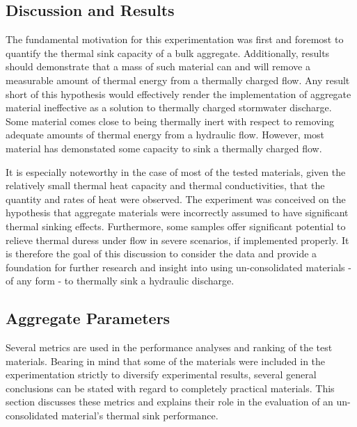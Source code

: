 

\begin{center}
\section{Discussion and Results}
\end{center}

The fundamental motivation for this experimentation was first and foremost to quantify the thermal sink capacity of a bulk aggregate. Additionally, results should demonstrate that a mass of such material can and will remove a measurable amount of thermal energy from a thermally charged flow. Any result short of this hypothesis would effectively render the implementation of aggregate material ineffective as a solution to thermally charged stormwater discharge. Some material comes close to being thermally inert with respect to removing adequate amounts of thermal energy from a hydraulic flow. However, most material has demonstated some capacity to sink a thermally charged flow.
 
It is especially noteworthy in the case of most of the tested materials, given the relatively small thermal heat capacity and thermal conductivities, that the quantity and rates of heat were observed. The experiment was conceived on the hypothesis that aggregate materials were incorrectly assumed to have significant thermal sinking effects. Furthermore, some samples offer significant potential to relieve thermal duress under flow in severe scenarios, if implemented properly. It is therefore the goal of this discussion to consider the data and provide a foundation for further research and insight into using un-consolidated materials - of any form - to thermally sink a hydraulic discharge.

\subsection{Aggregate Parameters}

Several metrics are used in the performance analyses and ranking of the test materials. Bearing in mind that some of the materials were included in the experimentation strictly to diversify experimental results, several general conclusions can be stated with regard to completely practical materials. This section discusses these metrics and explains their role in the evaluation of an un-consolidated material's thermal sink performance.

